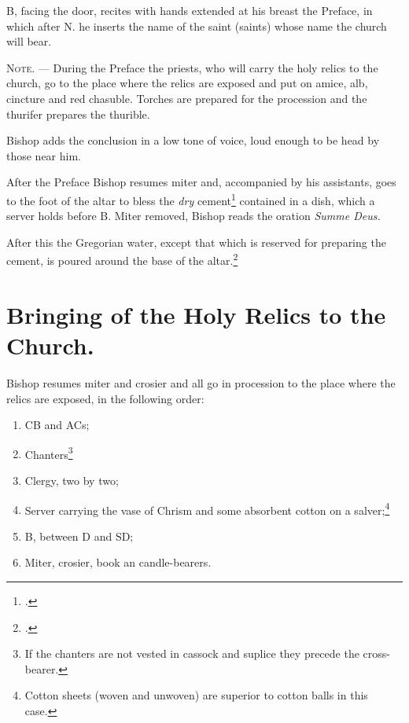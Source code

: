 \documentclass[letterpaper]{report}
\begin{document}
{\rubric B, facing the door, recites with hands extended at his breast the
Preface, in which after N. he inserts the name of the saint (saints) whose name
the church will bear.

\textsc{Note. ---} During the Preface the priests, who will carry the holy
relics to the church, go to the place where the relics are exposed and put on
amice, alb, cincture and red chasuble. Torches are prepared for the procession
and the thurifer prepares the thurible.

Bishop adds the conclusion in a low tone of voice, loud enough to be head by those
near him.

\rubric After the Preface Bishop resumes miter and, accompanied by his assistants,
goes to the foot of the altar to bless the \textit{dry} cement\footcite[The
Pontifical prescrives that he should first mix the cement with the water which
he previously blessed and then bless the mixture. This is not feasible and
consequently it is better to keep sufficient amount of water in a separate
vessel to be poured over the dry cement shortly before it is to be used for
closing the sepulchre.][footnote, p. 77.]{consecranda} contained in a dish,
which a server holds before B. Miter removed, Bishop reads the oration \textit{Summe
Deus.}

After this the Gregorian water, except that which is reserved for preparing the
cement, is poured around the base of the altar.\footcite[If much water remains
only a small quantity of it is poured around the base of the altar, and what is
left is afterwards poured into the \textit{secrarium.}][footnote 1, p.
78.]{consecranda}

\section{Bringing of the Holy Relics to the Church.}

\rubric Bishop resumes miter and crosier and all go in procession to the place where
the relics are exposed, in the following order:

\begin{enumerate}
    \item CB and ACs;
    \item Chanters\footnote{If the chanters are not vested in cassock and
        suplice they precede the cross-bearer.}
    \item Clergy, two by two;
    \item Server carrying the vase of Chrism and some absorbent cotton on a
        salver;\footnote{Cotton sheets (woven and unwoven) are superior to
        cotton balls in this case.}
    \item B, between D and SD;
    \item Miter, crosier, book an candle-bearers.
\end{enumerate}

}
\end{document}

